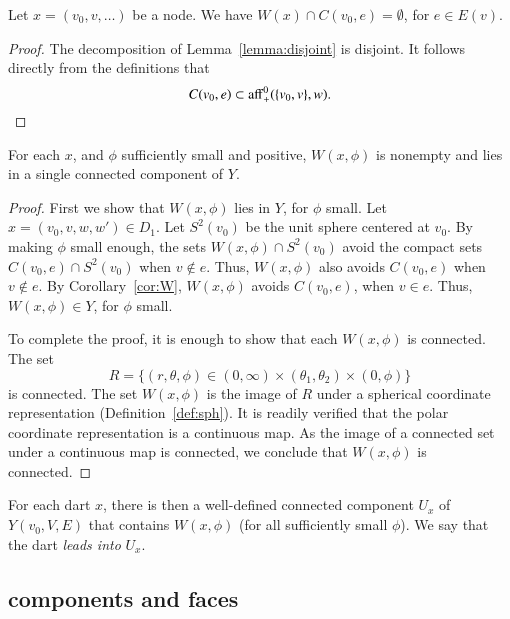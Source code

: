 \begin{corollary}  
Let $x = (v_0,v,\ldots)$ be a node.
We have $W(x)\cap C(v_0,e)=\emptyset$, for $e\in E(v)$.
\end{corollary}

\begin{proof} The decomposition of Lemma~\ref{lemma:disjoint} is
disjoint.  It follows directly from the definitions that
   $$C(v_0,e)\subset {\operatorname{aff}}_+^0(\{v_0,v\},w).$$
\end{proof}

\begin{lemma} For each $x$, and $\phi$ sufficiently small and positive,
$W(x,\phi)$ is nonempty and lies in a single connected
component of $Y$.
\end{lemma}

\begin{proof}  First we show that $W(x,\phi)$ lies in $Y$,
for $\phi$ small.  Let $x=(v_0,v,w,w')\in D_1$.  
Let $S^2(v_0)$ be the unit sphere centered at $v_0$.
By making $\phi$ small enough,
the sets $W(x,\phi)\cap S^2(v_0)$
avoid the compact sets $C(v_0,e)\cap S^2(v_0)$ when $v\not\in e$.
Thus, $W(x,\phi)$ also avoids $C(v_0,e)$ when $v\not\in e$.
By Corollary~\ref{cor:W}, $W(x,\phi)$ avoids $C(v_0,e)$, when $v\in e$.
Thus, $W(x,\phi)\in Y$, for $\phi$ small.

To complete the proof, it is enough to show that each $W(x,\phi)$ is
connected.  
The  set
   $$
   R=\{(r,\theta,\phi) \in (0,\infty) \times (\theta_1,\theta_2) \times (0,\phi)\}
   $$
is connected.
The set $W(x,\phi)$  is the image of $R$
under a spherical coordinate representation (Definition~\ref{def:sph}).
It is readily verified that the polar coordinate representation is
a continuous map. As the image of a connected set under a continuous map
is connected, we conclude that $W(x,\phi)$ is connected.
\end{proof}

\begin{definition} For each dart $x$, 
there is then a well-defined connected
component $U_x$ of $Y(v_0,V,E)$ 
that contains $W(x,\phi)$ (for all
sufficiently small $\phi$). We say that the dart {\it leads into}
$U_x$.
\end{definition}


\subsection{components and faces}



